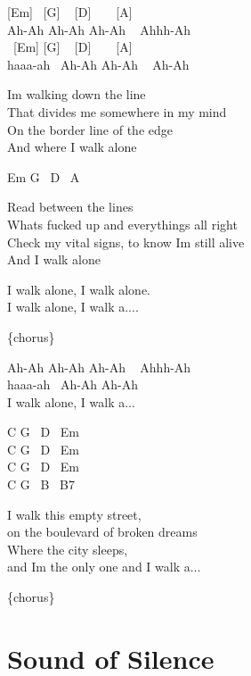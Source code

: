 \documentclass[
  letterpaper,
  twoside=false]{scrbook}
\begin{document}
{[}Em{]} ~{[}G{]} ~ {[}D{]} ~ ~ {[}A{]}\\
Ah-Ah Ah-Ah Ah-Ah ~ Ahhh-Ah\\
\hspace*{0.333em} ~{[}Em{]} {[}G{]} ~ {[}D{]} ~ ~ {[}A{]}\\
haaa-ah ~Ah-Ah Ah-Ah ~ Ah-Ah

I\textquotesingle m walking down the line\\
That divides me somewhere in my mind\\
On the border line of the edge\\
And where I walk alone

Em G ~D ~A

Read between the lines\\
What\textquotesingle s fucked up and everything\textquotesingle s all
right\\
Check my vital signs, to know I\textquotesingle m still alive\\
And I walk alone

I walk alone, I walk alone.\\
I walk alone, I walk a....

\{chorus\}

Ah-Ah Ah-Ah Ah-Ah ~ Ahhh-Ah\\
haaa-ah ~Ah-Ah Ah-Ah ~\\
I walk alone, I walk a...

C G ~D ~Em\\
C G ~D ~Em\\
C G ~D ~Em\\
C G ~B ~B7

I walk this empty street,\\
on the boulevard of broken dreams\\
Where the city sleeps,\\
and I\textquotesingle m the only one and I walk a...

\{chorus\}

\hypertarget{sound-of-silence}{%
\chapter{Sound of Silence}\label{sound-of-silence}}
\end{document}

